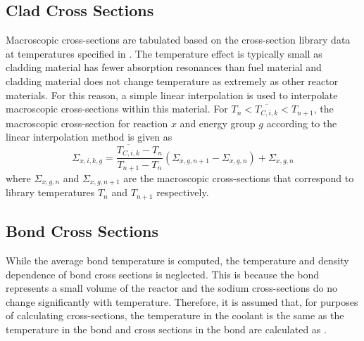   \subsection{Clad Cross Sections}
    Macroscopic cross-sections are tabulated based 
    on the cross-section library data at temperatures specified in
    . The temperature effect is typically small as cladding
    material has fewer absorption resonances than fuel material and cladding
    material does not change temperature as extremely as other reactor
    materials. For this reason, a simple linear interpolation is used to 
    interpolate macroscopic cross-sections within this material. For 
    $T_n < \overline{T_{C,i,k}} < T_{n+1}$, the macroscopic cross-section for 
    reaction $x$ and energy group $g$ according to the linear interpolation 
    method is given as
    \begin{equation}
      \label{eq:xs_linear_interpolation}
      \Sigma_{x,i,k,g} = 
        \frac{\overline{T_{C,i,k}} - T_{n}}{T_{n+1}-T_{n}} 
        (\Sigma_{x,g,n+1} - \Sigma_{x,g,n})  + \Sigma_{x,g,n}
    \end{equation}
    where $\Sigma_{x,g,n}$ and $\Sigma_{x,g,n+1}$ are the macroscopic
    cross-sections that correspond to library temperatures $T_n$ and $T_{n+1}$
    respectively. 

  \subsection{Bond Cross Sections}
    While the average bond temperature is computed, the temperature and density
    dependence of bond cross sections is neglected. This is because the bond 
    represents a small volume of the reactor and the sodium cross-sections 
    do no change significantly with temperature. Therefore, it is assumed that,
    for purposes of calculating cross-sections, the temperature in the coolant
    is the same as the temperature in the bond and cross sections in the bond
    are calculated as .

